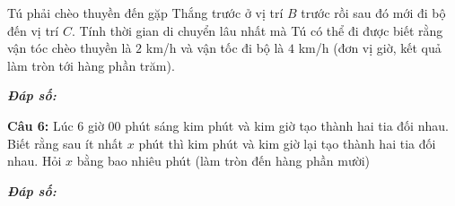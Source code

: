 \documentclass[12pt, a4paper]{article}
\begin{document}
\vspace{-0.7cm}

Tú phải chèo thuyền đến gặp Thắng trước ở vị trí $ B $ trước rồi sau đó mới đi bộ đến vị trí $ C $. Tính thời gian di chuyển lâu nhất mà Tú có thể đi được biết rằng vận tóc chèo thuyền là $ 2 $ km/h và vận tốc đi bộ là $ 4 $ km/h (đơn vị giờ, kết quả làm tròn tới hàng phần trăm).

	\textit{\textbf{Đáp số: }}
	\framebox[20mm]{\rule{0pt}{4mm}}


\textbf{Câu 6: } Lúc 6 giờ 00 phút sáng kim phút và kim giờ tạo thành hai tia đối nhau. Biết rằng sau ít nhất $ x $ phút thì kim phút và kim giờ lại tạo thành hai tia đối nhau. Hỏi $ x $ bằng bao nhiêu phút (làm tròn đến hàng phần mười)

	\textit{\textbf{Đáp số: }}
	\framebox[20mm]{\rule{0pt}{4mm}}
\end{document}
